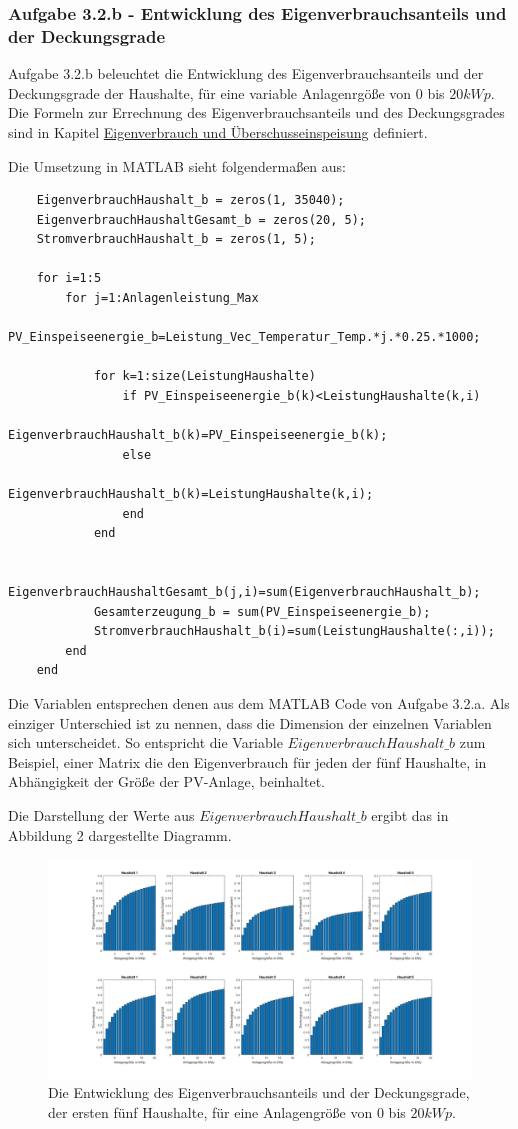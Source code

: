\documentclass[a4paper,12pt]{article}
\begin{document}
	\subsubsection{Aufgabe 3.2.b - Entwicklung des Eigenverbrauchsanteils und der Deckungsgrade}
	Aufgabe 3.2.b beleuchtet die Entwicklung des Eigenverbrauchsanteils und der Deckungsgrade der Haushalte, für eine variable Anlagenrgöße von $0$ bis $20kWp$.\newline
	Die Formeln zur Errechnung des Eigenverbrauchsanteils und des Deckungsgrades sind in Kapitel \hyperref[sec:eigenverbrauchueberschusseinspeisung]{Eigenverbrauch und Überschusseinspeisung} definiert.\\ \par
	Die Umsetzung in MATLAB sieht folgendermaßen aus:
	\begin{lstlisting}
	EigenverbrauchHaushalt_b = zeros(1, 35040);
	EigenverbrauchHaushaltGesamt_b = zeros(20, 5);
	StromverbrauchHaushalt_b = zeros(1, 5);
	
	for i=1:5
		for j=1:Anlagenleistung_Max
			PV_Einspeiseenergie_b=Leistung_Vec_Temperatur_Temp.*j.*0.25.*1000;
			
			for k=1:size(LeistungHaushalte)
				if PV_Einspeiseenergie_b(k)<LeistungHaushalte(k,i)
					EigenverbrauchHaushalt_b(k)=PV_Einspeiseenergie_b(k);
				else
					EigenverbrauchHaushalt_b(k)=LeistungHaushalte(k,i);
				end
			end
			
			EigenverbrauchHaushaltGesamt_b(j,i)=sum(EigenverbrauchHaushalt_b);
			Gesamterzeugung_b = sum(PV_Einspeiseenergie_b);
			StromverbrauchHaushalt_b(i)=sum(LeistungHaushalte(:,i));
		end
	end
	\end{lstlisting}
	Die Variablen entsprechen denen aus dem MATLAB Code von Aufgabe 3.2.a. Als einziger Unterschied ist zu nennen, dass die Dimension der einzelnen Variablen sich unterscheidet. So entspricht die Variable $EigenverbrauchHaushalt\_b$ zum Beispiel, einer Matrix die den Eigenverbrauch für jeden der fünf Haushalte, in Abhängigkeit der Größe der PV-Anlage, beinhaltet.\\ \par
	\noindent
	Die Darstellung der Werte aus $EigenverbrauchHaushalt\_b$ ergibt das in Abbildung 2 dargestellte Diagramm.
	\begin{figure}[H]
		\centering
		\includegraphics[width=12cm]{img/results/EigenverbrauchDeckungsanteil}
		\caption{Die Entwicklung des Eigenverbrauchsanteils und der Deckungsgrade, der ersten fünf Haushalte, für eine Anlagengröße von $0$ bis $20kWp$.}
	\end{figure}
\end{document}
